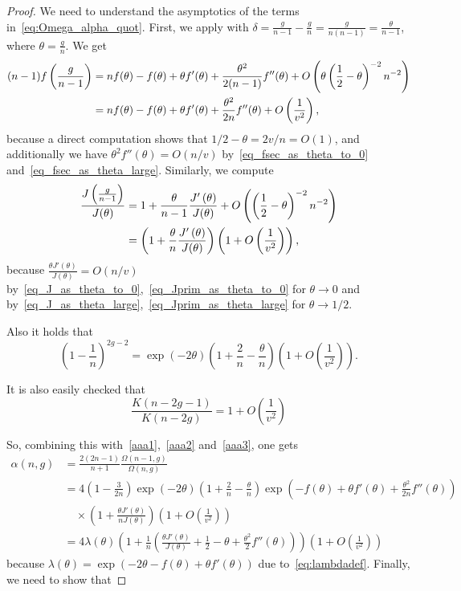 \documentclass[a4paper,12pt]{article}
\theoremstyle{definition}
\newcommand{\f}[2]{f\left(\frac{#1}{#2}\right)}
\newcommand{\bigO}[1]{O\left({#1}\right)}
\newcommand{\halfminth}{\left(\frac 1 2 -\theta\right)}
\newcommand{\bigpar}[1]{\left({#1}\right)}
\begin{document}
\begin{proof}
We need to understand the asymptotics of the terms in~\eqref{eq:Omega_alpha_quot}. 
First, we apply  with $\delta=\frac{g}{n-1}-\frac{g}{n}=\frac{g}{n(n-1)}=\frac{\theta}{n-1}$, where $\theta=\frac{g}{n}$. We get
\begin{align}
(n-1)\f{g}{n-1}
    &= nf(\theta)-f(\theta)+\theta f'(\theta)+\frac{\theta^2}{2(n-1)}f''(\theta)+\bigO{\theta\halfminth^{-2}n^{-2}}\notag\\
    &= nf(\theta)-f(\theta)+\theta f'(\theta)+\frac{\theta^2}{2n}f''(\theta)+\bigO{\frac{1}{v^2}},\label{aaa1}
\end{align}
because a direct computation shows that $1/2-\theta=2v/n = O(1)$, and additionally we have $\theta^2f''(\theta)=O(n/v)$ by~\eqref{eq_fsec_as_theta_to_0} and~\eqref{eq_fsec_as_theta_large}. 
%
Similarly, we compute
\begin{align}
\frac{J\left(\frac{g}{n-1}\right)}{J(\theta)}&=1+\frac{\theta}{n-1}\frac{J'\left(\theta\right)}{J(\theta)}+\bigO{\halfminth^{-2} n^{-2}}\notag\\
&=\bigpar{1+\frac{\theta}{n}\frac{J'\left(\theta\right)}{J(\theta)}}\bigpar{1+\bigO{\frac{1}{v^2}}}, \label{aaa2}
\end{align}
because  $\frac{\theta J'(\theta)}{J(\theta)}=O(n/v)$ by~\eqref{eq_J_as_theta_to_0},~\eqref{eq_Jprim_as_theta_to_0} for $\theta\to 0$ and by~\eqref{eq_J_as_theta_large},~\eqref{eq_Jprim_as_theta_large} for $\theta\to1/2$.


Also it holds that
\begin{equation}\label{aaa3}
    \left(1-\frac{1}{n}\right)^{2g-2}   
    =\exp(-2\theta)\left(1+\frac{2}{n}-\frac{\theta}{n}\right)\bigpar{1+\bigO{\frac{1}{v^2}}}.
\end{equation}

It is also easily checked that
\[\frac{K(n-2g-1)}{ K(n-2g)}=1+\bigO{\frac{1}{v^2}} \]

So, combining this with~\eqref{aaa1},~\eqref{aaa2} and~\eqref{aaa3}, one gets
\begin{align*}
\alpha(n,g)&=\frac{2(2n-1)}{n+1}\frac{\Omega(n-1,g)}{\Omega(n,g)}\\
&=4\left(1-\frac{3}{2n}\right)\exp(-2\theta)\left(1+\frac{2}{n}-\frac{\theta}{n}\right)\exp\left(-f(\theta)+\theta f'(\theta)+\frac{\theta^2}{2n}f''(\theta)\right)\\
&\quad\times\left(1+\frac{\theta J'\left(\theta\right)}{nJ\left(\theta\right)}\right)\bigpar{1+\bigO{\frac{1}{v^2}}}\\
&=4\lambda(\theta)\left(1+\frac{1}{n}\left(\frac{\theta J'\left(\theta\right)}{J\left(\theta\right)}+\frac{1}{2}-{\theta}+\frac{\theta^2}{2}f''(\theta)\right)\right)\bigpar{1+\bigO{\frac{1}{v^2}}}
\end{align*}
because $\lambda(\theta)=\exp(-2\theta-f(\theta)+\theta f'(\theta))$ due to~\eqref{eq:lambdadef}. 
Finally, we need to show that


\end{proof}
\end{document}
